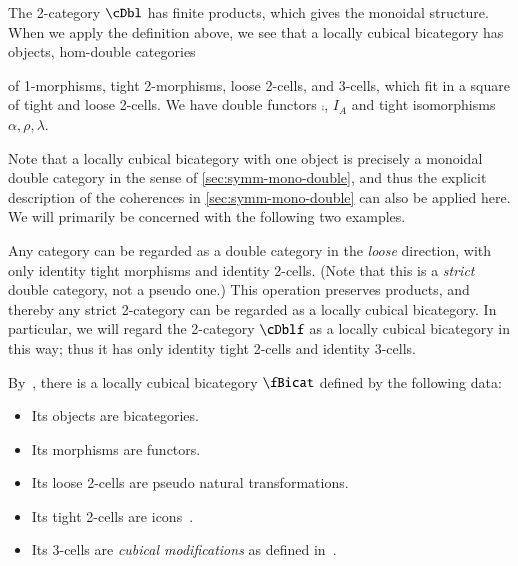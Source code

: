 The 2-category $\cDbl$ has finite products, which gives the monoidal structure. 
When we apply the definition above, we see that a locally cubical bicategory has objects, hom-double categories {of 1-morphisms, tight 2-morphisms, loose 2-cells, and 3-cells, which fit in a square of tight and loose 2-cells. We have double functors $\comp$, $I_A$ and tight isomorphisms $\alpha, \rho, \lambda$.

Note that a locally cubical bicategory with one object is precisely a monoidal double category in the sense of \cref{sec:symm-mono-double}, and thus the explicit description of the coherences in \cref{sec:symm-mono-double} can also be applied here.
We will primarily be concerned with the following two examples.

\begin{eg}
  Any category can be regarded as a double category in the \emph{loose} direction, with only identity tight morphisms and identity 2-cells.
  (Note that this is a \emph{strict} double category, not a pseudo one.)
  This operation preserves products, and thereby any strict 2-category can be regarded as a locally cubical bicategory.
  In particular, we will regard the 2-category $\cDblf$ as a locally cubical bicategory in this way; thus it has only identity tight 2-cells and identity 3-cells.
\end{eg}

\begin{eg}
  By~\cite[Corollary 12]{gg:ldstr-tricat}, there is a locally cubical bicategory $\fBicat$ defined by the following data:
  \begin{itemize}
  \item Its objects are bicategories.
  \item Its morphisms are functors.
  \item Its loose 2-cells are pseudo natural transformations.
  \item Its tight 2-cells are icons~\cite{lack:icons}.
  \item Its 3-cells are \emph{cubical modifications} as defined in~\cite[Definition 13]{gg:ldstr-tricat}.
  \end{itemize}
\end{eg}

}
